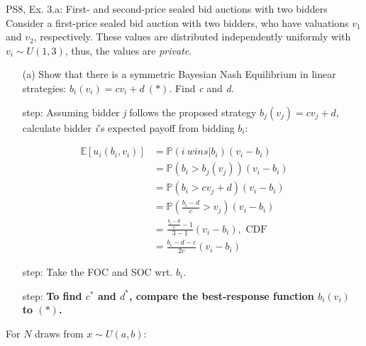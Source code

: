 \begin{frame}{PS8, Ex. 3.a: First- and second-price sealed bid auctions with two bidders}
    Consider a first-price sealed bid auction with two bidders, who have valuations $v_1$ and $v_2$, respectively. These values are distributed independently uniformly with $v_i\sim U(1,3)$, thus, the values are \textit{private}.
    \vspace{-4pt}
    \begin{itemize}
      \item[(a)] Show that there is a symmetric Bayesian Nash Equilibrium in linear strategies: $b_i(v_i) = cv_i + d\ (*)$. Find \textit{c} and \textit{d}.
    \end{itemize}
    \vspace{-8pt}
    \begin{multicols}{2}
      \begin{itemize}
        \item[\nth{1} step:] Assuming bidder \textit{j} follows the proposed strategy $b_j(v_j) = cv_j + d$, calculate bidder \textit{i}'s expected payoff from bidding $b_i$:
      \end{itemize}
      \vspace{-12pt}
      \begin{align*}
        \mathbb{E}[u_i(b_i,v_i)]&=\mathbb{P}(i\ wins|b_i)(v_i-b_i)\\
                                &=\mathbb{P}(b_i>b_j(v_j))(v_i-b_i)\\
                                &=\mathbb{P}(b_i>cv_j+d)(v_i-b_i)\\
                                &=\mathbb{P}\left(\frac{b_i-d}{c}>v_j\right)(v_i-b_i)\\
                                &=\frac{\frac{b_i-d}{c}-1}{3-1}(v_i-b_i),\text{ CDF}\\
                                &=\frac{b_i-d-c}{2c}(v_i-b_i)
      \end{align*}
      \vspace{-18pt}
      \begin{itemize}
        \item[\nth{2} step:] Take the FOC and SOC wrt. $b_i$.
        \item[\nth{3} step:] \textbf{To find $c^*$ and $d^*$, compare the best-response function $b_i(v_i)$ to $(*)$.}
      \end{itemize}
      \vfill\null\columnbreak
      For $N$ draws from $x\sim U(a, b):$
      \vspace{-6pt}
      \begin{enumerate}

\end{enumerate}
\end{multicols}
\end{frame}
